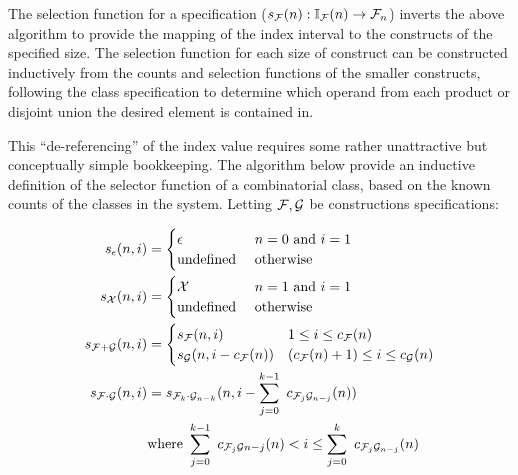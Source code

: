 The selection function for a specification 
($ s_{\mathcal{F}}(n) : \mathbb{I}_{\mathcal{F}}(n) \rightarrow \mathcal{F}_{n} $) inverts the above algorithm
to provide the mapping of the index interval to the constructs of the specified size.
The selection function for each size of construct 
can be constructed inductively 
from the counts and selection functions of the smaller constructs,
following the class specification to determine 
which operand from each product or disjoint union
the desired element is contained in.

This ``de-referencing'' of the index value requires 
some rather unattractive but conceptually simple bookkeeping.
The algorithm below provide an inductive definition of
the selector function of a combinatorial class,
based on the known counts of the classes in the system.
Letting $\mathcal{F}, \mathcal{G}$ be constructions specifications:

\begin{df}


\begin{equation}
\begin{aligned}
s_{\epsilon} (n, i) & = 
     \begin{cases} \epsilon & n = 0 \text{ and } i = 1 \\ 
                               \text{undefined } & \text{otherwise}
                               \end{cases} \\
s_{\mathcal{X}} (n, i)   & =  
     \begin{cases} \mathcal{X} & n = 1 \text{ and } i = 1 \\ 
                               \text{undefined } & \text{otherwise}
                               \end{cases} \\
s_{\mathcal{F} + \mathcal{G}} (n, i) & =
    \begin{cases} s_{\mathcal{F}} (n, i) & 1 \le i \le c_{\mathcal{F}}(n) \\
                              s_{\mathcal{G}} (n, i - c_{\mathcal{F}}(n)) & (c_{\mathcal{F}}(n) + 1) \le i \le c_{\mathcal{G}}(n)
                              \end{cases} \\
s_{\mathcal{F} \cdot \mathcal{G}}(n,i) & = s_{\mathcal{F}_{k} \cdot \mathcal{G}_{n-k}}(n, i -  \sum_{j=0}^{k-1}\ c_{\mathcal{F}_{j} \mathcal{G}_{n-j}}(n)) \\
& \text{where } \sum_{j=0}^{k-1}\ c_{\mathcal{F}_{j} \mathcal{G}{n-j}}(n) < i \le \sum_{j=0}^{k}\ c_{\mathcal{F}_{j}  \mathcal{G}_{n-j}}(n)
\end{aligned}
\end{equation}
\end{df}


